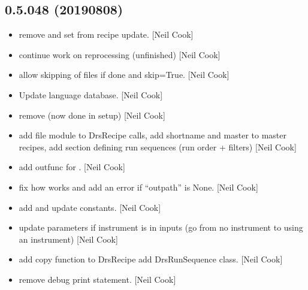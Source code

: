 \documentclass[a4paper,10pt,english]{report}
\begin{document}
\subsection{0.5.048 (2019\sphinxhyphen{}08\sphinxhyphen{}08)}
\label{\detokenize{misc/changelog:id114}}\begin{itemize}
\item {} 
 \sphinxhyphen{} remove  and set  from
recipe update. {[}Neil Cook{]}

\item {} 
 \sphinxhyphen{} continue work on reprocessing
(unfinished) {[}Neil Cook{]}

\item {} 
 \sphinxhyphen{} allow skipping of files if done and
\textendash{}skip=True. {[}Neil Cook{]}

\item {} 
Update language database. {[}Neil Cook{]}

\item {} 
 \sphinxhyphen{} remove  (now done in setup) {[}Neil
Cook{]}

\item {} 
 \sphinxhyphen{} add file module to
DrsRecipe calls, add shortname and master to master recipes, add
section defining run sequences (run order + filters) {[}Neil Cook{]}

\item {} 
 \sphinxhyphen{} add outfunc for . {[}Neil Cook{]}

\item {} 
 \sphinxhyphen{} fix how 
works and add an error if “outpath” is None. {[}Neil Cook{]}

\item {} 
 \sphinxhyphen{} add and update constants.
{[}Neil Cook{]}

\item {} 
 \sphinxhyphen{} update parameters if instrument is in inputs (go from
no instrument to using an instrument) {[}Neil Cook{]}

\item {} 
 \sphinxhyphen{} add copy function to DrsRecipe add DrsRunSequence
class. {[}Neil Cook{]}

\item {} 
 \sphinxhyphen{} remove debug print statement. {[}Neil Cook{]}

\end{itemize}
\end{document}
